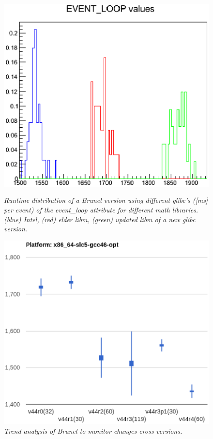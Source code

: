 \documentclass[a4paper]{jpconf}
\begin{document}
\begin{figure}[t]
\begin{minipage}[t]{17pc}
\includegraphics[scale=0.55]{figures/brunel_basic_libm.eps}
\caption{\small \textit{Runtime distribution of a Brunel version using different glibc's ([ms] per event) of the event\_loop attribute for different math libraries. (blue) Intel, (red) elder libm, (green) updated libm of a new glibc version.}}
\label{fig:brunel_basic_libm}
\end{minipage}\hspace{1pc}
\begin{minipage}[t]{17pc}
\includegraphics[scale=0.48]{figures/brunel_trend_analysis.eps}
\caption{\small \textit{Trend analysis of Brunel to monitor changes cross versions.}}
\label{fig:brunel_trend}
\end{minipage}
\end{figure}
\end{document}
